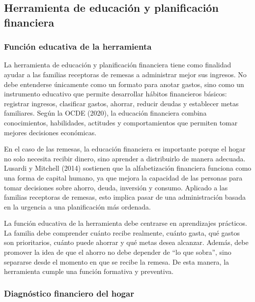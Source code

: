 \documentclass[12pt,letterpaper]{article}
\begin{document}
\subsection{\texorpdfstring{\textbf{Herramienta de educación y planificación financiera}}{Herramienta de educación y planificación financiera}}\label{herramienta-de-educaciuxf3n-y-planificaciuxf3n-financiera}

\subsubsection{\texorpdfstring{\textbf{Función educativa de la herramienta}}{Función educativa de la herramienta}}\label{funciuxf3n-educativa-de-la-herramienta}

La herramienta de educación y planificación financiera tiene como finalidad ayudar a las familias receptoras de remesas a administrar mejor sus ingresos. No debe entenderse únicamente como un formato para anotar gastos, sino como un instrumento educativo que permite desarrollar hábitos financieros básicos: registrar ingresos, clasificar gastos, ahorrar, reducir deudas y establecer metas familiares. Según la OCDE (2020), la educación financiera combina conocimientos, habilidades, actitudes y comportamientos que permiten tomar mejores decisiones económicas.

En el caso de las remesas, la educación financiera es importante porque el hogar no solo necesita recibir dinero, sino aprender a distribuirlo de manera adecuada. Lusardi y Mitchell (2014) sostienen que la alfabetización financiera funciona como una forma de capital humano, ya que mejora la capacidad de las personas para tomar decisiones sobre ahorro, deuda, inversión y consumo. Aplicado a las familias receptoras de remesas, esto implica pasar de una administración basada en la urgencia a una planificación más ordenada.

La función educativa de la herramienta debe centrarse en aprendizajes prácticos. La familia debe comprender cuánto recibe realmente, cuánto gasta, qué gastos son prioritarios, cuánto puede ahorrar y qué metas desea alcanzar. Además, debe promover la idea de que el ahorro no debe depender de ``lo que sobra'', sino separarse desde el momento en que se recibe la remesa. De esta manera, la herramienta cumple una función formativa y preventiva.

\subsubsection{\texorpdfstring{\textbf{Diagnóstico financiero del hogar}}{Diagnóstico financiero del hogar}}\label{diagnuxf3stico-financiero-del-hogar}
\end{document}
